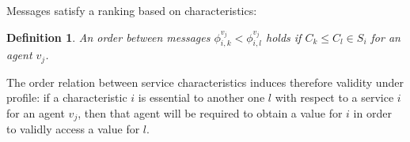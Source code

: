 \documentclass[compsoc, conference, letterpaper, 10pt, times]{IEEEtran}
\newtheorem{definition}{Definition}
\begin{document}
Messages satisfy a ranking based on characteristics:

\begin{definition}\label{def:dependencypackages}
An order between messages $\phi^{v_{j}}_{i,k}<\phi^{v_{j}}_{i,l}$ holds if $C_{k}\leq C_{l} \in S_{i}$ for an agent $v_{j}$.
%
\end{definition}

The order relation between service characteristics induces therefore validity under profile: if a characteristic $i$ is essential to another one $l$ with respect to a service $i$ for an agent $v_{j}$, then that agent will be required to obtain a value for  $i$ in order to validly access a value for $l$. 

%
\end{document}
